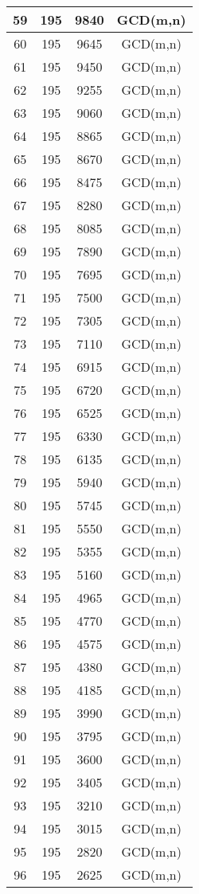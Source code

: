 \begin{longtable}{c|c|c|c}
59&195&9840&GCD(m,n)\\\hline
60&195&9645&GCD(m,n)\\\hline
61&195&9450&GCD(m,n)\\\hline
62&195&9255&GCD(m,n)\\\hline
63&195&9060&GCD(m,n)\\\hline
64&195&8865&GCD(m,n)\\\hline
65&195&8670&GCD(m,n)\\\hline
66&195&8475&GCD(m,n)\\\hline
67&195&8280&GCD(m,n)\\\hline
68&195&8085&GCD(m,n)\\\hline
69&195&7890&GCD(m,n)\\\hline
70&195&7695&GCD(m,n)\\\hline
71&195&7500&GCD(m,n)\\\hline
72&195&7305&GCD(m,n)\\\hline
73&195&7110&GCD(m,n)\\\hline
74&195&6915&GCD(m,n)\\\hline
75&195&6720&GCD(m,n)\\\hline
76&195&6525&GCD(m,n)\\\hline
77&195&6330&GCD(m,n)\\\hline
78&195&6135&GCD(m,n)\\\hline
79&195&5940&GCD(m,n)\\\hline
80&195&5745&GCD(m,n)\\\hline
81&195&5550&GCD(m,n)\\\hline
82&195&5355&GCD(m,n)\\\hline
83&195&5160&GCD(m,n)\\\hline
84&195&4965&GCD(m,n)\\\hline
85&195&4770&GCD(m,n)\\\hline
86&195&4575&GCD(m,n)\\\hline
87&195&4380&GCD(m,n)\\\hline
88&195&4185&GCD(m,n)\\\hline
89&195&3990&GCD(m,n)\\\hline
90&195&3795&GCD(m,n)\\\hline
91&195&3600&GCD(m,n)\\\hline
92&195&3405&GCD(m,n)\\\hline
93&195&3210&GCD(m,n)\\\hline
94&195&3015&GCD(m,n)\\\hline
95&195&2820&GCD(m,n)\\\hline
96&195&2625&GCD(m,n)\\\hline

\end{longtable}
